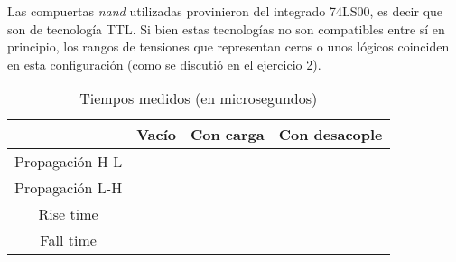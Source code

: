 \documentclass[../../e3_tp2_main.tex]{subfiles}
\begin{document}
Las compuertas \textit{nand} utilizadas provinieron del integrado 74LS00, es decir que son de tecnolog\'ia TTL. Si bien estas tecnolog\'ias no son compatibles entre s\'i en principio, los rangos de tensiones que representan ceros o unos l\'ogicos coinciden en esta configuraci\'on (como se discuti\'o en el ejercicio 2). 

\begin{table}[H]
	\centering
	\begin{tabular}{|c|c|c|c|}
	\hline
                  & Vac\'io & Con carga & Con desacople \\ \hline \hline
	Propagaci\'on H-L &         &           &               \\ \hline
	Propagaci\'on L-H &         &           &               \\ \hline
	Rise time         &         &           &               \\ \hline
	Fall time         &         &           &               \\ \hline
	\end{tabular}
	\caption{Tiempos medidos (en microsegundos)}
\end{table}
\end{document}
